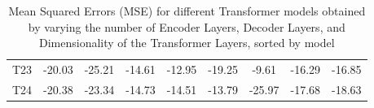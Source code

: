 \begin{table}[]
{\begin{tabular}{ccccccccc}
    T23   & \cellcolor[HTML]{FFDD82}-20.03 & \cellcolor[HTML]{FDB97B}-25.21 & \cellcolor[HTML]{D6DF81}-14.61 & \cellcolor[HTML]{FB9674}-12.95 & \cellcolor[HTML]{8CC97D}-19.25 & \cellcolor[HTML]{FA8671}-9.61  & \cellcolor[HTML]{FCAA78}-16.29 & \cellcolor[HTML]{FCAC78}-16.85 \\
    T24   & \cellcolor[HTML]{FFEA84}-20.38 & \cellcolor[HTML]{FB9C75}-23.34 & \cellcolor[HTML]{C7DB80}-14.73 & \cellcolor[HTML]{FCA978}-14.51 & \cellcolor[HTML]{F5E883}-13.79 & \cellcolor[HTML]{63BE7B}-25.97 & \cellcolor[HTML]{FFDA81}-17.68 & \cellcolor[HTML]{FFE283}-18.63
    \end{tabular}%
    }
    \caption{Mean Squared Errors (MSE) for different Transformer models obtained by varying the number of Encoder Layers, Decoder Layers, and Dimensionality of the Transformer Layers, sorted by model}
    \label{T4_M}
    \end{table}


